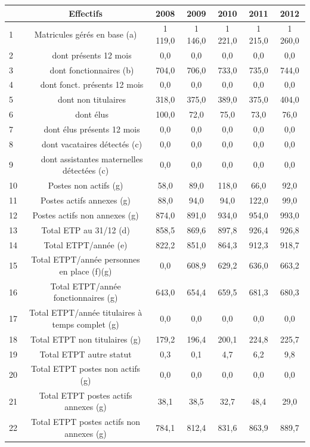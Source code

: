 \begin{longtable}[]{@{}lcccccc@{}}
\toprule
& Effectifs & 2008 & 2009 & 2010 & 2011 & 2012\tabularnewline
\midrule
\endhead
1 & Matricules gérés en base (a) & 1 119,0 & 1 146,0 & 1 221,0 & 1 215,0
& 1 260,0\tabularnewline
2 & ~~~dont présents 12 mois & 0,0 & 0,0 & 0,0 & 0,0 &
0,0\tabularnewline
3 & ~~~dont fonctionnaires (b) & 704,0 & 706,0 & 733,0 & 735,0 &
744,0\tabularnewline
4 & ~~~dont fonct. présents 12 mois & 0,0 & 0,0 & 0,0 & 0,0 &
0,0\tabularnewline
5 & ~~~dont non titulaires & 318,0 & 375,0 & 389,0 & 375,0 &
404,0\tabularnewline
6 & ~~~dont élus & 100,0 & 72,0 & 75,0 & 73,0 & 76,0\tabularnewline
7 & ~~~dont élus présents 12 mois & 0,0 & 0,0 & 0,0 & 0,0 &
0,0\tabularnewline
8 & ~~~dont vacataires détectés (c) & 0,0 & 0,0 & 0,0 & 0,0 &
0,0\tabularnewline
9 & ~~~dont assistantes maternelles détectées (c) & 0,0 & 0,0 & 0,0 &
0,0 & 0,0\tabularnewline
10 & Postes non actifs (g) & 58,0 & 89,0 & 118,0 & 66,0 &
92,0\tabularnewline
11 & Postes actifs annexes (g) & 88,0 & 94,0 & 94,0 & 122,0 &
99,0\tabularnewline
12 & Postes actifs non annexes (g) & 874,0 & 891,0 & 934,0 & 954,0 &
993,0\tabularnewline
13 & Total ETP au 31/12 (d) & 858,5 & 869,6 & 897,8 & 926,4 &
926,8\tabularnewline
14 & Total ETPT/année (e) & 822,2 & 851,0 & 864,3 & 912,3 &
918,7\tabularnewline
15 & Total ETPT/année personnes en place (f)(g) & 0,0 & 608,9 & 629,2 &
636,0 & 663,2\tabularnewline
16 & Total ETPT/année fonctionnaires (g) & 643,0 & 654,4 & 659,5 & 681,3
& 680,3\tabularnewline
17 & Total ETPT/année titulaires à temps complet (g) & 0,0 & 0,0 & 0,0 &
0,0 & 0,0\tabularnewline
18 & Total ETPT non titulaires (g) & 179,2 & 196,4 & 200,1 & 224,8 &
225,7\tabularnewline
19 & Total ETPT autre statut & 0,3 & 0,1 & 4,7 & 6,2 &
9,8\tabularnewline
20 & Total ETPT postes non actifs (g) & 0,0 & 0,0 & 0,0 & 0,0 &
0,0\tabularnewline
21 & Total ETPT postes actifs annexes (g) & 38,1 & 38,5 & 32,7 & 48,4 &
29,0\tabularnewline
22 & Total ETPT postes actifs non annexes (g) & 784,1 & 812,4 & 831,6 &
863,9 & 889,7\tabularnewline
\bottomrule
\end{longtable}

